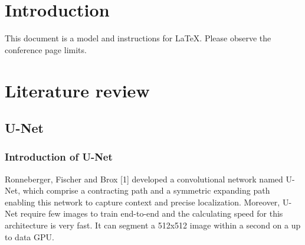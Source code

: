 \documentclass[conference]{IEEEtran}
\begin{document}


\section{Introduction}
This document is a model and instructions for \LaTeX.
Please observe the conference page limits. 

\section{Literature review}

\subsection{U-Net}
\subsubsection{Introduction of U-Net}
Ronneberger, Fischer and Brox [1] developed a convolutional network named U-Net, which comprise a contracting path and a symmetric expanding path enabling this network to capture context and precise localization. Moreover, U-Net require few images to train end-to-end and the calculating speed for this architecture is very fast. It can segment a 512x512 image within a second on a up to data GPU.
\end{document}
